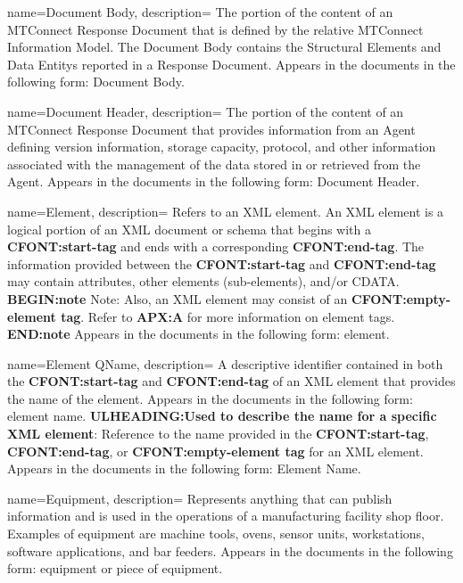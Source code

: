 {
    name={Document Body},
	description={
	The portion of the content of an \gls{MTConnect Response Document} that is defined by the relative \gls{MTConnect Information Model}. The \gls{Document Body} contains the \glspl{Structural Element} and \glspl{Data Entity} reported in a \gls{Response Document}.
	Appears in the documents in the following form: \gls{Document Body}.
}
}

{
    name={Document Header},
	description={
	The portion of the content of an \gls{MTConnect Response Document} that provides information from an \gls{Agent} defining version information, storage capacity, protocol, and other information associated with the management of the data stored in or retrieved from the \gls{Agent}.
	Appears in the documents in the following form: \gls{Document Header}.
}
}

{
    name={Element},
	description={
	Refers to an XML element.
	An XML element is a logical portion of an XML document or schema that begins with a \textbf{CFONT:start-tag} and ends with a corresponding \textbf{CFONT:end-tag}.  
	The information provided between the \textbf{CFONT:start-tag} and \textbf{CFONT:end-tag} may contain attributes, other elements (sub-elements), and/or CDATA.
    \textbf{BEGIN:note}
	Note:  Also, an XML element may consist of an \textbf{CFONT:empty-element tag}.  Refer to \textbf{APX:A} for more information on element tags.
    \textbf{END:note}
	Appears in the documents in the following form: element.
}
}

{
    name={Element QName},
	description={
	A descriptive identifier contained in both the \textbf{CFONT:start-tag} and \textbf{CFONT:end-tag} of an XML element that provides the name of the element.
	Appears in the documents in the following form: element name.
	\textbf{ULHEADING:Used to describe the name for a specific XML element}:
	Reference to the name provided in the \textbf{CFONT:start-tag}, \textbf{CFONT:end-tag}, or \textbf{CFONT:empty-element tag} for an XML element.
	Appears in the documents in the following form: \gls{Element Name}.
}
}

{
    name={Equipment},
	description={
	Represents anything that can publish information and is used in the operations of a manufacturing facility shop floor.  Examples of equipment are machine tools, ovens, sensor units, workstations, software applications, and bar feeders.
	Appears in the documents in the following form: equipment or piece of equipment.
}
}

